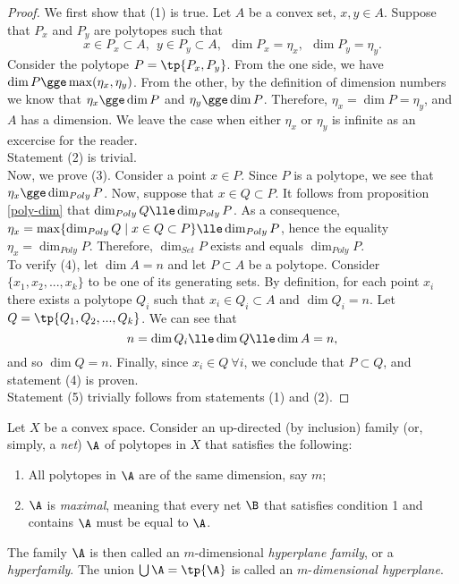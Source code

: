 \documentclass[12pt, a4paper]{article}
\begin{document}
\begin{proof}
    We first show that (1) is true. Let \(A\) be a convex set, \(x, y \in A\). Suppose that \(P_x\) and \(P_y\) are polytopes such that \[x \in P_x \subset A, \ \ y \in P_y \subset A, \ \ \dim P_x = \eta_x, \ \ \dim P_y = \eta_y.\] Consider the polytope \(P = \tp{P_x, P_y}\). From the one side, we have \(\dim P \gge \max (\eta_x, \eta_y)\). From the other, by the definition of dimension numbers we know that \(\eta_x \gge \dim P\) and \(\eta_y \gge \dim P\). Therefore, \(\eta_x = \dim P = \eta_y\), and \(A\) has a dimension. We leave the case when either \(\eta_x\) or \(\eta_y\) is infinite as an excercise for the reader.\\
    
    Statement (2) is trivial.\\
    
    Now, we prove (3). Consider a point \(x \in P\). Since \(P\) is a polytope, we see that \(\eta_x \gge \dim_{Poly} P\). Now, suppose that \(x \in Q \subset P\). It follows from proposition \ref{poly-dim} that \(\dim_{Poly} Q \lle \dim_{Poly} P\). As a consequence, \(\eta_x = \max \{\dim_{Poly} Q \mid x \in Q \subset P\} \lle \dim_{Poly} P\), hence the equality \(\eta_x = \dim_{Poly} P\). Therefore, \(\dim_{Set} P\) exists and equals \(\dim_{Poly} P\).\\
    
    To verify (4), let \(\dim A = n\) and let \(P \subset A\) be a polytope. Consider \(\{x_1, x_2, ..., x_k\}\) to be one of its generating sets. By definition, for each point \(x_i\) there exists a polytope \(Q_i\) such that \(x_i \in Q_i \subset A\) and \(\dim Q_i = n\). Let \(Q = \tp{Q_1, Q_2, ..., Q_k}\). We can see that \[n = \dim Q_i \lle \dim Q \lle \dim A = n,\] and so \(\dim Q = n\). Finally, since \(x_i \in Q \ \forall i\), we conclude that \(P \subset Q\), and statement (4) is proven.\\
    
    Statement (5) trivially follows from statements (1) and (2).
\end{proof}

\begin{definition}[Hyperplane]\label{def-hyper}
    Let \(X\) be a convex space. Consider an up-directed (by inclusion) family (or, simply, a \textit{net}) \(\A\) of polytopes in \(X\) that satisfies the following:

    \begin{enumerate}
        \item All polytopes in \(\A\) are of the same dimension, say \(m\);
        
        \item \(\A\) is \textit{maximal}, meaning that every net \(\B\) that satisfies condition 1 and contains \(\A\) must be equal to \(\A\).
    \end{enumerate}

    The family \(\A\) is then called an \(m\)-dimensional \textit{hyperplane family}, or a \textit{hyperfamily}. The union \(\bigcup \A = \tp{\A}\) is called an \(m\)-\textit{dimensional hyperplane}.
\end{definition}
\end{document}
